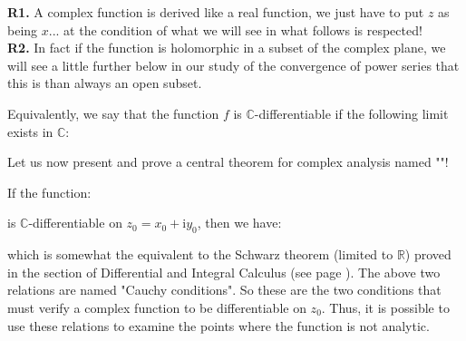 	\begin{tcolorbox}[title=Remarks,arc=10pt,breakable,drop lifted shadow,
  skin=enhanced,
  skin first is subskin of={enhancedfirst}{arc=10pt,no shadow},
  skin middle is subskin of={enhancedmiddle}{arc=10pt,no shadow},
  skin last is subskin of={enhancedlast}{drop lifted shadow}]
	\textbf{R1.} A complex function is derived like a real function, we just have to put $z$ as being $x$... at the condition of what we will see in what follows is respected!\\
	
	\textbf{R2.} In fact if the function is holomorphic in a subset of the complex plane, we will see a little further below in our study of the convergence of power series that this is than always an open subset.
	\end{tcolorbox}
	Equivalently, we say that the function $f$ is $\mathbb{C}$-differentiable if the following limit exists in $\mathbb{C}$:
	
	Let us now present and prove a central theorem for complex analysis named ""!
	
	If the function:
	
	is $\mathbb{C}$-differentiable on $z_0=x_0+\mathrm{i}y_0$, then we have:
	
	which is somewhat the equivalent to the Schwarz theorem (limited to $\mathbb{R}$) proved in the section of Differential and Integral Calculus (see page \pageref{Schwarz theorem}). The above two relations are named "Cauchy conditions". So these are the two conditions that must verify a complex function to be differentiable on $z_0$. Thus, it is possible to use these relations to examine the points where the function is not analytic.
	
